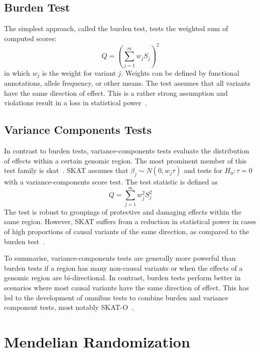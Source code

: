 \subsection{Burden Test}
\label{sub:burden_test}

The simplest approach, called the burden test, tests the weighted sum of computed scores:
\begin{equation}\label{eq:burden}
  Q = {(\sum^{m}_{j=1} w_{j} S_{j})}^2
\end{equation}
in which $w_j$ is the weight for variant $j$.
Weights can be defined by functional annotations, allele frequency, or other means.
The test assumes that all variants  have the same direction of effect.
This is a rather strong assumption and violations result in a loss in statistical power~\cite{Derkach2013a}.

\subsection{Variance Components Tests}
\label{sub:variance_component_tests}
In contrast to burden tests, variance-components tests evaluate the distribution of effects within a certain genomic region.
The most prominent member of this test family is \acrfull{skat}~\cite{Wu2011}.
SKAT assumes that $\beta_j\sim N(0,w_j\tau)$ and tests for $H_0: \tau = 0$ with a variance-components score test.
The test statistic is defined as
\begin{equation}\label{eq:skat}
  Q = \sum^{m}_{j=1} w_{j}^2 S_{j}^2
\end{equation}
The test is robust to groupings of protective and damaging effects within the same region.
However,  SKAT suffers from a reduction in statistical power in cases of high proportions of causal variants of the same direction, as compared to the burden test~\cite{Derkach2013a}.

To summarise, variance-components tests are generally more powerful than burden tests if a region has many non-causal variants or when the effects of a genomic region are bi-directional.
In contrast, burden tests perform better in scenarios where most causal variants have the same direction of effect.
This has led to the development of omnibus tests to combine burden and variance component tests, most notably SKAT-O~\cite{Lee2012}.

\section{Mendelian Randomization}
\label{sec:joint_association_study}

